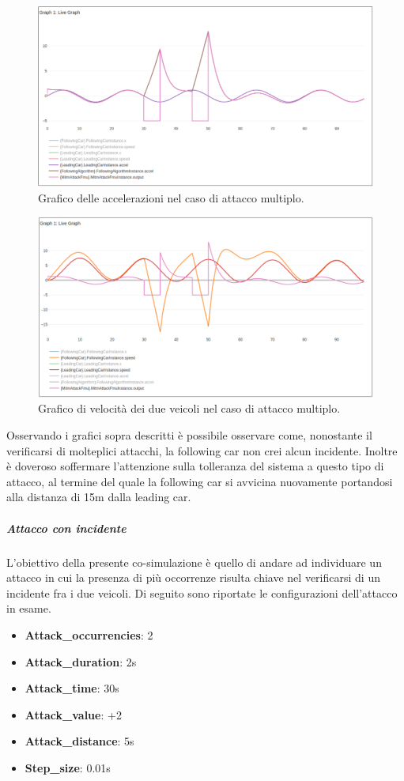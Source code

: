 \begin{figure}[H]
	\centering
	\includegraphics[width=\textwidth]{img/MultiAttackAccelPlotAccelNoCrash.png}
	\caption{Grafico delle accelerazioni nel caso di attacco multiplo.}
\end{figure}
\begin{figure}[H]
	\centering
	\includegraphics[width=\textwidth]{img/MultiAttackAccelPlotSpeedNoCrash.png}
	\caption{Grafico di velocità dei due veicoli nel caso di attacco multiplo.}
\end{figure}

Osservando i grafici sopra descritti è possibile osservare come, nonostante il verificarsi di molteplici attacchi, la following car non crei alcun incidente. Inoltre è doveroso soffermare l'attenzione sulla tolleranza del sistema a questo tipo di attacco, al termine del quale la following car si avvicina nuovamente portandosi alla distanza di 15m dalla leading car.

\subparagraph{Attacco con incidente}
L'obiettivo della presente co-simulazione è quello di andare ad individuare un attacco in cui la presenza di più occorrenze risulta chiave nel verificarsi di un incidente fra i due veicoli. Di seguito sono riportate le configurazioni dell'attacco in esame.
\begin{itemize}
\item \textbf{Attack\_occurrencies}: 2
\item \textbf{Attack\_duration}: 2s
\item \textbf{Attack\_time}: 30s
\item \textbf{Attack\_value}: +2
\item \textbf{Attack\_distance}: 5s
\item \textbf{Step\_size}: 0.01s
\end{itemize}

